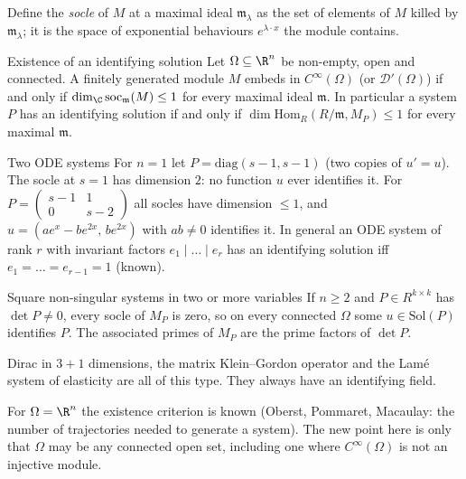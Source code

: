Define the \emph{socle} of $M$ at a maximal ideal $\mathfrak m_\lambda$ as the set of elements of $M$ killed by $\mathfrak m_\lambda$; it is the space of exponential behaviours $e^{\lambda\cdot x}$ the module contains.

\begin{theorem}{Existence of an identifying solution  \proved}\label{thm:sysex}
Let $\Omega\subseteq\R^n$ be non-empty, open and connected. A finitely generated module $M$ embeds in $C^\infty(\Omega)$ (or $\mathcal D'(\Omega)$) if and only if $\dim_\C\mathrm{soc}_{\mathfrak m}(M)\le1$ for every maximal ideal $\mathfrak m$. In particular a system $P$ has an identifying solution if and only if $\dim\mathrm{Hom}_R(R/\mathfrak m,M_P)\le1$ for every maximal $\mathfrak m$.
\end{theorem}

\begin{example}{Two ODE systems}
For $n=1$ let $P=\mathrm{diag}(s-1,s-1)$ (two copies of $u'=u$). The socle at $s=1$ has dimension $2$: no function $u$ ever identifies it. For $P=\begin{pmatrix}s-1&1\\0&s-2\end{pmatrix}$ all socles have dimension $\le1$, and $u=(ae^x-be^{2x},\,be^{2x})$ with $ab\ne0$ identifies it. In general an ODE system of rank $r$ with invariant factors $e_1\mid\dots\mid e_r$ has an identifying solution iff $e_1=\dots=e_{r-1}=1$  (known).
\end{example}

\begin{theorem}{Square non-singular systems in two or more variables  \proved}\label{thm:sysc1}
If $n\ge2$ and $P\in R^{k\times k}$ has $\det P\ne0$, every socle of $M_P$ is zero, so on every connected $\Omega$ some $u\in\mathrm{Sol}(P)$ identifies $P$. The associated primes of $M_P$ are the prime factors of $\det P$.
\end{theorem}

Dirac in $3+1$ dimensions, the matrix Klein--Gordon operator and the Lam\'e system of elasticity are all of this type. They always have an identifying field.

\begin{caution}[title=Where this is not new]
For $\Omega=\R^n$ the existence criterion is known (Oberst, Pommaret, Macaulay: the number of trajectories needed to generate a system). The new point here is only that $\Omega$ may be any connected open set, including one where $C^\infty(\Omega)$ is not an injective module.
\end{caution}


